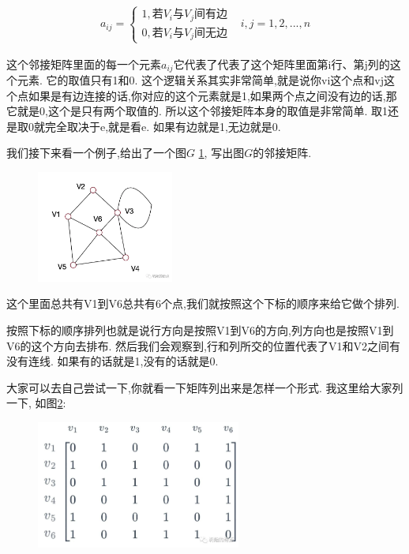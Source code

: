 \begin{align*}
a_{ij}=\begin{cases}1, \mbox{若}V_i\mbox{与}V_j\mbox{间有边} \\ 0, \mbox{若}V_i\mbox{与}V_j\mbox{间无边} \end{cases}
& i,j = 1, 2, ..., n
\end{align*}

这个邻接矩阵里面的每一个元素$a_{ij}$它代表了代表了这个矩阵里面第i行、第j列的这个元素. 它的取值只有1和0. 这个逻辑关系其实非常简单,就是说你vi这个点和vj这个点如果是有边连接的话,你对应的这个元素就是1,如果两个点之间没有边的话,那它就是0,这个是只有两个取值的. 所以这个邻接矩阵本身的取值是非常简单. 取1还是取0就完全取决于e,就是看e. 如果有边就是1,无边就是0. 

我们接下来看一个例子,给出了一个图$G$ \ref{fig:img25_3}, 写出图$G$的邻接矩阵. 

\begin{figure}[ht]
  \centering
  \includegraphics[width=0.4\textwidth]{asset/20231227145100.png}
  \caption{}
  \label{fig:img25_3}
\end{figure}

这个里面总共有V1到V6总共有6个点,我们就按照这个下标的顺序来给它做个排列. 

按照下标的顺序排列也就是说行方向是按照V1到V6的方向,列方向也是按照V1到V6的这个方向去排布. 然后我们会观察到,行和列所交的位置代表了V1和V2之间有没有连线. 如果有的话就是1,没有的话就是0. 

大家可以去自己尝试一下,你就看一下矩阵列出来是怎样一个形式. 我这里给大家列一下, 如图\ref{fig:img25_4}: 

\begin{figure}[ht]
  \centering
  \includegraphics[width=0.6\textwidth]{asset/20231227145115.png}
  \caption{}
  \label{fig:img25_4}
\end{figure}

